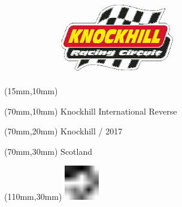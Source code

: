 \null\newpage
\begin{textblock*}{50mm}(15mm,10mm)%
\includegraphics[width=50mm]{LG/KNO.png}
\end{textblock*}
\begin{textblock*}{130mm}(70mm,10mm)%
{\fontsize{20}{20}\selectfont Knockhill International Reverse}\\
\end{textblock*}
\begin{textblock*}{120mm}(70mm,20mm)%
{\fontsize{16}{16}\selectfont Knockhill / 2017}\\
\end{textblock*}
\begin{textblock*}{120mm}(70mm,30mm)%
{\fontsize{12}{12}\selectfont Scotland}
\end{textblock*}
\begin{textblock*}{30mm}(110mm,30mm)%
\centering
\includegraphics[height=15mm]{icons/fa-rotate-left.pdf}
\end{textblock*}

